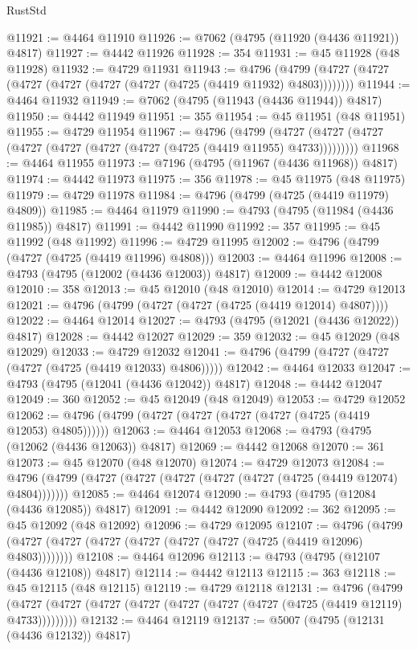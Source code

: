 \begin{lexlean}{RustStd}
\begin{coremodule}
@11921 := @4464 @11910
@11926 := @7062 (@4795 (@11920 (@4436 @11921)) @4817)
@11927 := @4442 @11926
@11928 := 354
@11931 := @45 @11928 (@48 @11928)
@11932 := @4729 @11931
@11943 := @4796 (@4799 (@4727 (@4727 (@4727 (@4727 (@4727 (@4727 (@4725 (@4419 @11932) @4803))))))))
@11944 := @4464 @11932
@11949 := @7062 (@4795 (@11943 (@4436 @11944)) @4817)
@11950 := @4442 @11949
@11951 := 355
@11954 := @45 @11951 (@48 @11951)
@11955 := @4729 @11954
@11967 := @4796
    (@4799 (@4727 (@4727 (@4727 (@4727 (@4727 (@4727 (@4727 (@4725 (@4419 @11955) @4733)))))))))
@11968 := @4464 @11955
@11973 := @7196 (@4795 (@11967 (@4436 @11968)) @4817)
@11974 := @4442 @11973
@11975 := 356
@11978 := @45 @11975 (@48 @11975)
@11979 := @4729 @11978
@11984 := @4796 (@4799 (@4725 (@4419 @11979) @4809))
@11985 := @4464 @11979
@11990 := @4793 (@4795 (@11984 (@4436 @11985)) @4817)
@11991 := @4442 @11990
@11992 := 357
@11995 := @45 @11992 (@48 @11992)
@11996 := @4729 @11995
@12002 := @4796 (@4799 (@4727 (@4725 (@4419 @11996) @4808)))
@12003 := @4464 @11996
@12008 := @4793 (@4795 (@12002 (@4436 @12003)) @4817)
@12009 := @4442 @12008
@12010 := 358
@12013 := @45 @12010 (@48 @12010)
@12014 := @4729 @12013
@12021 := @4796 (@4799 (@4727 (@4727 (@4725 (@4419 @12014) @4807))))
@12022 := @4464 @12014
@12027 := @4793 (@4795 (@12021 (@4436 @12022)) @4817)
@12028 := @4442 @12027
@12029 := 359
@12032 := @45 @12029 (@48 @12029)
@12033 := @4729 @12032
@12041 := @4796 (@4799 (@4727 (@4727 (@4727 (@4725 (@4419 @12033) @4806)))))
@12042 := @4464 @12033
@12047 := @4793 (@4795 (@12041 (@4436 @12042)) @4817)
@12048 := @4442 @12047
@12049 := 360
@12052 := @45 @12049 (@48 @12049)
@12053 := @4729 @12052
@12062 := @4796 (@4799 (@4727 (@4727 (@4727 (@4727 (@4725 (@4419 @12053) @4805))))))
@12063 := @4464 @12053
@12068 := @4793 (@4795 (@12062 (@4436 @12063)) @4817)
@12069 := @4442 @12068
@12070 := 361
@12073 := @45 @12070 (@48 @12070)
@12074 := @4729 @12073
@12084 := @4796 (@4799 (@4727 (@4727 (@4727 (@4727 (@4727 (@4725 (@4419 @12074) @4804)))))))
@12085 := @4464 @12074
@12090 := @4793 (@4795 (@12084 (@4436 @12085)) @4817)
@12091 := @4442 @12090
@12092 := 362
@12095 := @45 @12092 (@48 @12092)
@12096 := @4729 @12095
@12107 := @4796 (@4799 (@4727 (@4727 (@4727 (@4727 (@4727 (@4727 (@4725 (@4419 @12096) @4803))))))))
@12108 := @4464 @12096
@12113 := @4793 (@4795 (@12107 (@4436 @12108)) @4817)
@12114 := @4442 @12113
@12115 := 363
@12118 := @45 @12115 (@48 @12115)
@12119 := @4729 @12118
@12131 := @4796
    (@4799 (@4727 (@4727 (@4727 (@4727 (@4727 (@4727 (@4727 (@4725 (@4419 @12119) @4733)))))))))
@12132 := @4464 @12119
@12137 := @5007 (@4795 (@12131 (@4436 @12132)) @4817)

\end{coremodule}
\end{lexlean}
